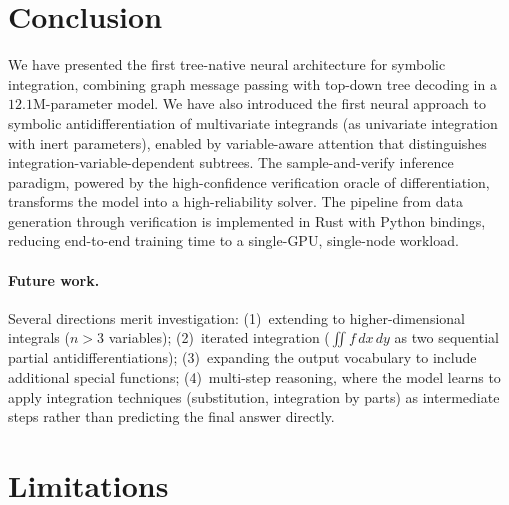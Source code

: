 \documentclass{article}
\begin{document}
\section{Conclusion}
\label{sec:conclusion}

We have presented the first tree-native neural architecture for symbolic
integration, combining graph message passing with top-down tree decoding
in a $12.1$M-parameter model. We have also introduced the first neural
approach to symbolic antidifferentiation of multivariate integrands
(as univariate integration with inert parameters), enabled by variable-aware
attention that distinguishes integration-variable-dependent subtrees. The
sample-and-verify inference paradigm, powered by the high-confidence verification
oracle of differentiation, transforms the model into a high-reliability
solver. The pipeline from data generation through verification is
implemented in Rust with Python bindings, reducing end-to-end training
time to a single-GPU, single-node workload.

\paragraph{Future work.}
Several directions merit investigation:
(1)~extending to higher-dimensional integrals ($n > 3$ variables);
(2)~iterated integration ($\iint f\,dx\,dy$ as two sequential partial
antidifferentiations);
(3)~expanding the output vocabulary to include additional special
functions;
(4)~multi-step reasoning, where the model learns to apply integration
techniques (substitution, integration by parts) as intermediate steps
rather than predicting the final answer directly.



\section*{Limitations}
\end{document}
